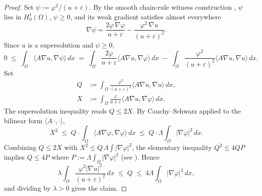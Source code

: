 \begin{proof}
\leanok
{}

Set $\psi := \varphi^2/(u+\varepsilon)$. By the smooth chain-rule witness
construction , $\psi$ lies in
$H^1_0(\Omega)$, $\psi \geq 0$, and its weak gradient satisfies almost
everywhere
\begin{equation*}
  \nabla\psi = \frac{2\varphi\,\nabla\varphi}{u+\varepsilon}
    - \frac{\varphi^2\,\nabla u}{(u+\varepsilon)^2}.
\end{equation*}
Since $u$ is a supersolution and $\psi \geq 0$,
\begin{equation*}
  0 \;\leq\; \int_\Omega \langle A\nabla u, \nabla\psi\rangle\,dx
   \;=\; \int_\Omega \frac{2\varphi}{u+\varepsilon}\langle A\nabla u,
       \nabla\varphi\rangle\,dx
   \;-\; \int_\Omega \frac{\varphi^2}{(u+\varepsilon)^2}
       \langle A\nabla u, \nabla u\rangle\,dx.
\end{equation*}
Set
\begin{align*}
  Q &:= \int_\Omega \frac{\varphi^2}{(u+\varepsilon)^2}\langle A\nabla u,\nabla u\rangle\,dx, \\
  X &:= \int_\Omega \frac{\varphi}{u+\varepsilon}\langle A\nabla u,\nabla\varphi\rangle\,dx.
\end{align*}
The supersolution inequality reads $Q \leq 2X$. By Cauchy--Schwarz applied to
the bilinear form $\langle A\,\cdot,\cdot\rangle$,
\begin{equation*}
  X^2 \;\leq\; Q \cdot \int_\Omega \langle A\nabla\varphi,\nabla\varphi\rangle\,dx
    \;\leq\; Q \cdot \Lambda \int_\Omega |\nabla\varphi|^2\,dx.
\end{equation*}
Combining $Q \leq 2X$ with $X^2 \leq Q\,\Lambda\int|\nabla\varphi|^2$, the
elementary inequality $Q^2 \leq 4QP$ implies $Q \leq 4P$ where
$P := \Lambda \int_\Omega |\nabla\varphi|^2$ (see
). Hence
\begin{equation*}
  \lambda \int_\Omega \frac{\varphi^2|\nabla u|^2}{(u+\varepsilon)^2}\,dx
    \;\leq\; Q \;\leq\; 4\Lambda \int_\Omega |\nabla\varphi|^2\,dx,
\end{equation*}
and dividing by $\lambda > 0$ gives the claim.
\end{proof}

